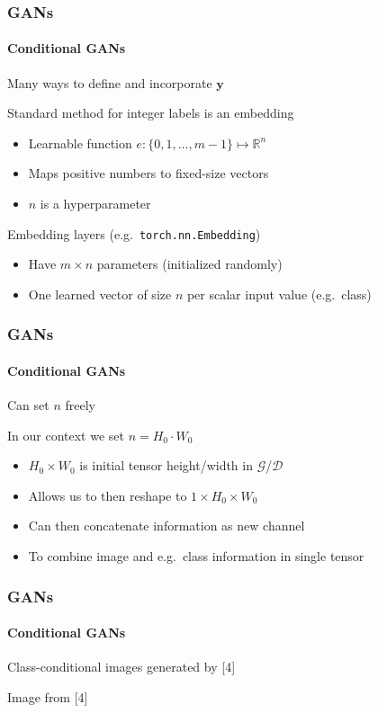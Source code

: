 \documentclass[xetex,professionalfont]{beamer}
\renewcommand\emph[1]{\textcolor{tuwcvl_cvl_blue}{#1}}
\newcommand{\RR}{\mathbb{R}}
\renewcommand{\vec}[1]{\ensuremath{\mathbf{#1}}}
\newcommand{\vy}{\vec{y}}
\newcommand{\cD}{\mathcal{D}}
\newcommand{\cG}{\mathcal{G}}
\begin{document}
\begin{frame}
	\frametitle{GANs}
	\framesubtitle{Conditional GANs}

	Many ways to define and incorporate $\vy$

	\bigskip

	Standard method for integer labels is an \emph{embedding}
	\begin{itemize}
		\item Learnable function $e:\{0,1,\dots,m-1\}\mapsto\RR^n$
		\item Maps positive numbers to fixed-size vectors
		\item $n$ is a hyperparameter
	\end{itemize}

	\bigskip

	\emph{Embedding layers} (e.g.~\texttt{torch.nn.Embedding})
	\begin{itemize}
		\item Have $m\times n$ parameters (initialized randomly)
		\item One learned vector of size $n$ per scalar input value (e.g.~class)
	\end{itemize}

\end{frame}


\begin{frame}
	\frametitle{GANs}
	\framesubtitle{Conditional GANs}

	Can set $n$ freely

	\bigskip

	In our context we set $n=H_0\cdot W_0$
	\begin{itemize}
		\item $H_0\times W_0$ is initial tensor height/width in $\cG$/$\cD$
		\item Allows us to then reshape to $1\times H_0\times W_0$
		\item Can then concatenate information as new channel
		\item To combine image and e.g.~class information in single tensor
	\end{itemize}

\end{frame}


\begin{frame}
	\frametitle{GANs}
	\framesubtitle{Conditional GANs}

	Class-conditional images generated by [4]

	\bigskip

	\begin{center}
		{\centering Image from [4]}
	\end{center}

\end{frame}
\end{document}
